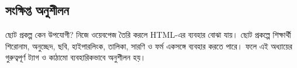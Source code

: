 \subsection{সংক্ষিপ্ত অনুশীলন}

\begin{boardbox}{ছোট প্রকল্প কেন উপযোগী?}
নিজে ওয়েবপেজ তৈরি করলে HTML-এর ব্যবহার বোঝা যায়। ছোট প্রকল্পে শিক্ষার্থী শিরোনাম, অনুচ্ছেদ, ছবি, হাইপারলিংক, তালিকা, সারণি ও ফর্ম একসঙ্গে ব্যবহার করতে পারে। ফলে এই অধ্যায়ের গুরুত্বপূর্ণ ট্যাগ ও কাঠামো ব্যবহারিকভাবে অনুশীলন হয়।
\end{boardbox}
